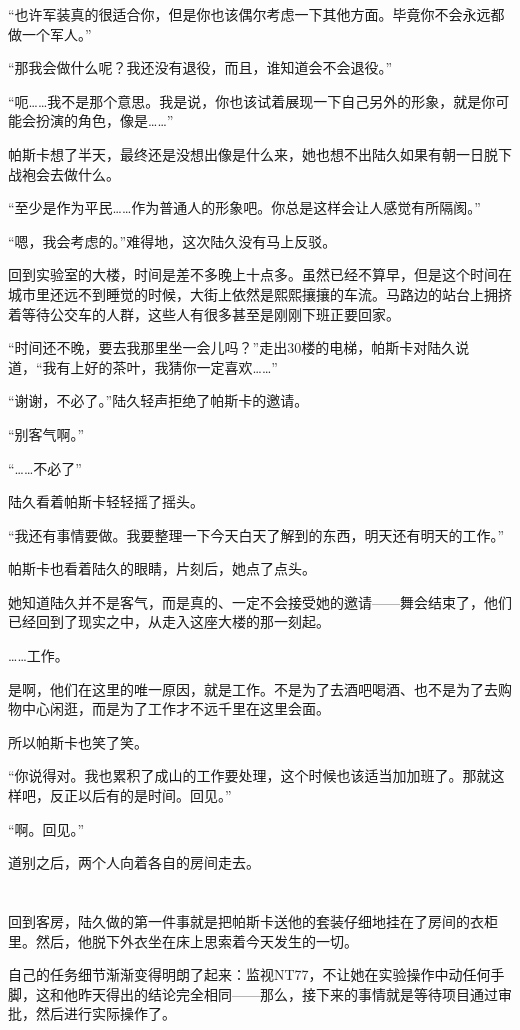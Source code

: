 “也许军装真的很适合你，但是你也该偶尔考虑一下其他方面。毕竟你不会永远都做一个军人。”

“那我会做什么呢？我还没有退役，而且，谁知道会不会退役。”

“呃……我不是那个意思。我是说，你也该试着展现一下自己另外的形象，就是你可能会扮演的角色，像是……”

帕斯卡想了半天，最终还是没想出像是什么来，她也想不出陆久如果有朝一日脱下战袍会去做什么。

“至少是作为平民……作为普通人的形象吧。你总是这样会让人感觉有所隔阂。”

“嗯，我会考虑的。”难得地，这次陆久没有马上反驳。

回到实验室的大楼，时间是差不多晚上十点多。虽然已经不算早，但是这个时间在城市里还远不到睡觉的时候，大街上依然是熙熙攘攘的车流。马路边的站台上拥挤着等待公交车的人群，这些人有很多甚至是刚刚下班正要回家。

“时间还不晚，要去我那里坐一会儿吗？”走出30楼的电梯，帕斯卡对陆久说道，“我有上好的茶叶，我猜你一定喜欢……”

“谢谢，不必了。”陆久轻声拒绝了帕斯卡的邀请。

“别客气啊。”

“……不必了”

陆久看着帕斯卡轻轻摇了摇头。

“我还有事情要做。我要整理一下今天白天了解到的东西，明天还有明天的工作。”

帕斯卡也看着陆久的眼睛，片刻后，她点了点头。

她知道陆久并不是客气，而是真的、一定不会接受她的邀请——舞会结束了，他们已经回到了现实之中，从走入这座大楼的那一刻起。

……工作。

是啊，他们在这里的唯一原因，就是工作。不是为了去酒吧喝酒、也不是为了去购物中心闲逛，而是为了工作才不远千里在这里会面。

所以帕斯卡也笑了笑。

“你说得对。我也累积了成山的工作要处理，这个时候也该适当加加班了。那就这样吧，反正以后有的是时间。回见。”

“啊。回见。”

道别之后，两个人向着各自的房间走去。\section*{}

回到客房，陆久做的第一件事就是把帕斯卡送他的套装仔细地挂在了房间的衣柜里。然后，他脱下外衣坐在床上思索着今天发生的一切。

自己的任务细节渐渐变得明朗了起来：监视NT77，不让她在实验操作中动任何手脚，这和他昨天得出的结论完全相同——那么，接下来的事情就是等待项目通过审批，然后进行实际操作了。

